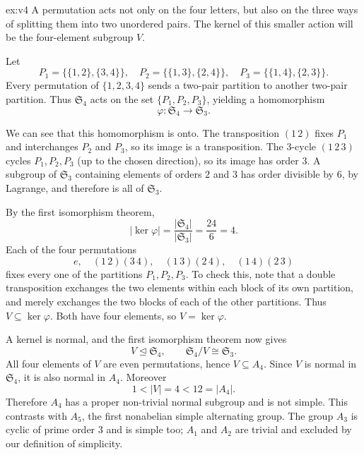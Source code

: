 \begin{solution}{ex:v4}
\idea A permutation acts not only on the four letters, but also on the three ways of splitting them into two unordered pairs. The kernel of this smaller action will be the four-element subgroup $V$.

\writeup Let
\[
P_1=\{\{1,2\},\{3,4\}\},\quad
P_2=\{\{1,3\},\{2,4\}\},\quad
P_3=\{\{1,4\},\{2,3\}\}.
\]
Every permutation of $\{1,2,3,4\}$ sends a two-pair partition to another two-pair partition. Thus $\mathfrak S_4$ acts on the set $\{P_1,P_2,P_3\}$, yielding a homomorphism
\[
\varphi:\mathfrak S_4\longrightarrow\mathfrak S_3.
\]

We can see that this homomorphism is onto. The transposition $(1\,2)$ fixes $P_1$ and interchanges $P_2$ and $P_3$, so its image is a transposition. The $3$-cycle $(1\,2\,3)$ cycles $P_1,P_2,P_3$ (up to the chosen direction), so its image has order $3$. A subgroup of $\mathfrak S_3$ containing elements of orders $2$ and $3$ has order divisible by $6$, by Lagrange, and therefore is all of $\mathfrak S_3$.

By the first isomorphism theorem,
\[
|\ker\varphi|=\frac{|\mathfrak S_4|}{|\mathfrak S_3|}
=\frac{24}{6}=4.
\]
Each of the four permutations
\[
e,\quad(1\,2)(3\,4),\quad(1\,3)(2\,4),\quad(1\,4)(2\,3)
\]
fixes every one of the partitions $P_1,P_2,P_3$. To check this, note that a double transposition exchanges the two elements within each block of its own partition, and merely exchanges the two blocks of each of the other partitions. Thus $V\subseteq\ker\varphi$. Both have four elements, so $V=\ker\varphi$.

A kernel is normal, and the first isomorphism theorem now gives
\[
\boxed{V\trianglelefteq\mathfrak S_4,\qquad
\mathfrak S_4/V\cong\mathfrak S_3}.
\]
All four elements of $V$ are even permutations, hence $V\subseteq A_4$. Since $V$ is normal in $\mathfrak S_4$, it is also normal in $A_4$. Moreover
\[
1<|V|=4<12=|A_4|.
\]
Therefore $A_4$ has a proper non-trivial normal subgroup and is not simple. This contrasts with $A_5$, the first nonabelian simple alternating group. The group $A_3$ is cyclic of prime order $3$ and is simple too; $A_1$ and $A_2$ are trivial and excluded by our definition of simplicity.
\end{solution}

